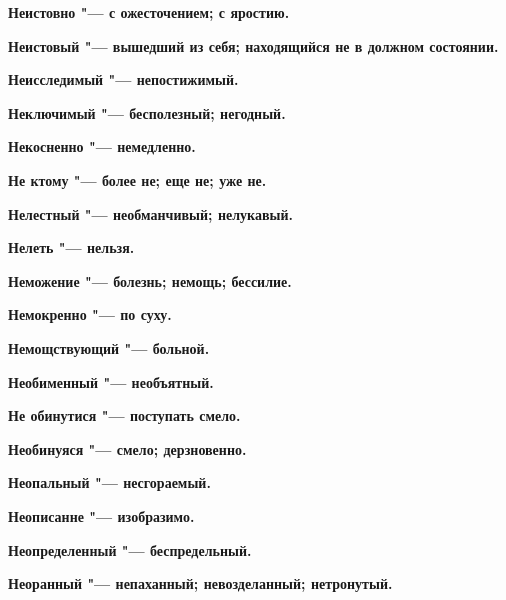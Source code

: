 \bfseries Неистовно \normalfont{} "--- с ожесточением; с яростию. 




\bfseries Неистовый \normalfont{} "--- вышедший из себя; находящийся не в должном состоянии. 




\bfseries Неисследимый \normalfont{} "--- непостижимый. 




\bfseries Неключимый \normalfont{} "--- бесполезный; негодный. 




\bfseries Некосненно \normalfont{} "--- немедленно. 




\bfseries Не ктому \normalfont{} "--- более не; еще не; уже не. 




\bfseries Нелестный \normalfont{} "--- необманчивый; нелукавый. 




\bfseries Нелеть \normalfont{} "--- нельзя. 




\bfseries Неможение \normalfont{} "--- болезнь; немощь; бессилие. 




\bfseries Немокренно \normalfont{} "--- по суху. 




\bfseries Немощствующий \normalfont{} "--- больной. 




\bfseries Необименный \normalfont{} "--- необъятный. 




\bfseries Не обинутися \normalfont{} "--- поступать смело. 




\bfseries Необинуяся \normalfont{} "--- смело; дерзновенно. 




\bfseries Неопальный \normalfont{} "--- несгораемый. 




\bfseries Неописанне \normalfont{} "--- изобразимо. 




\bfseries Неопределенный \normalfont{} "--- беспредельный. 




\bfseries Неоранный \normalfont{} "--- непаханный; невозделанный; нетронутый. 




